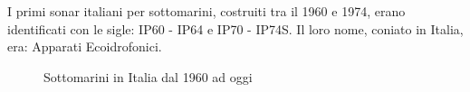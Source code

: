 I primi sonar italiani per sottomarini, costruiti tra il 1960 e 1974, erano identificati con le sigle: IP60 - IP64 e IP70 - IP74S. Il loro nome, coniato in Italia, era: Apparati Ecoidrofonici.

\begin{figure}[h]
\centering 
{} \quad
{} \quad
{} \quad
\caption [Sottomarini in italia dal 1960 ad oggi]{Sottomarini in Italia dal 1960 ad oggi}
\end{figure}

